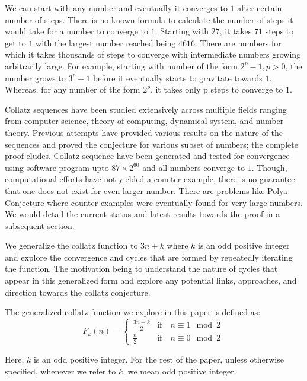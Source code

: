 \documentclass[12pt]{article} %
\begin{document}
We can start with any  number and eventually it converges to $1$ after certain number of steps. There is no known formula to calculate the number of steps it would take for a number to converge to $1$. Starting with $27$, it takes $71$ steps to get to $1$ with the largest number reached being $4616$. There are numbers for which it takes thousands of steps to converge with intermediate numbers growing arbitrarily large. For example, starting with number of the form $2^p - 1, p > 0$, the number grows to $3^p - 1$ before it eventually starts to gravitate towards $1$. Whereas, for any number of the form $2^p$, it takes only p steps to converge to $1$. 

Collatz sequences have been studied extensively across multiple fields ranging from computer science, theory of computing, dynamical system, and number theory. Previous attempts have provided various results on the nature of the sequences and proved the conjecture for various subset of numbers; the complete proof eludes. Collatz sequence have been generated and tested for convergence using software program upto $87 \times 2^{60}$ \cite{eric} and all numbers converge to $1$. Though, computational efforts have not yielded a counter example, there is no guarantee that one does not exist for even larger number. There are problems like Polya Conjecture where counter examples were eventually found for very large numbers. We would detail the current status and latest results towards the proof in a subsequent section.

We generalize the collatz function to $3n+ k$ where $k$ is an odd positive integer and explore the convergence and cycles that are formed by repeatedly iterating the function. The motivation being to understand the nature of cycles that appear in this generalized form and explore any potential links, approaches, and direction towards the collatz conjecture.

The generalized collatz function we explore in this paper is defined as:
\begin{equation}
F_k(n)= \begin{cases}    
    \frac{3n+k}{2}  & \text{if} \quad n \equiv 1 \mod 2\\
    \frac{n}{2}   & \text{if} \quad n \equiv 0 \mod2\
   \end{cases}
   \label{eqn:gcs}
\end{equation}

Here, $k$ is an odd positive integer. For the rest of the paper, unless otherwise specified, whenever we refer to $k$, we mean odd positive integer.
\end{document}
